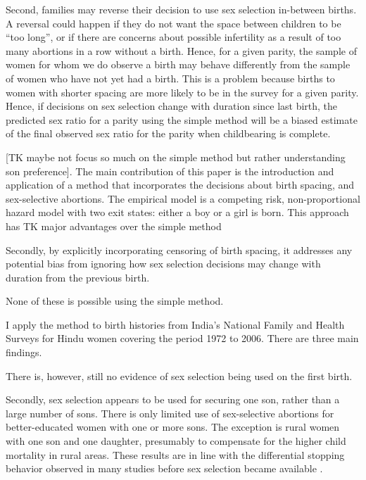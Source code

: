 \documentclass[12pt,letterpaper]{article}
\begin{document}
Second,
families may reverse their decision to use sex selection in-between births.
A reversal could happen if they do not want the space between children to be 
``too long'', or if there are concerns about possible infertility as a result of 
too many abortions in a row without a birth.
Hence, for a given parity, the sample of women for whom we do observe a birth 
may behave differently from the sample of women who have not yet had a birth.
This is a problem because births to women with shorter spacing are more likely 
to be in the survey for a given parity.
Hence, if decisions on sex selection change with duration since last birth,
the predicted sex ratio for a parity using the simple method will be a 
biased estimate of the final observed sex ratio for the parity when 
childbearing is complete.



[TK maybe not focus so much on the simple method but rather understanding son preference].
The main contribution of this paper is the introduction and application of a method that 
incorporates the decisions about birth spacing, and sex-selective abortions.
The empirical model is a competing risk, non-proportional hazard model with two exit 
states: either a boy or a girl is born.
This approach has TK major advantages over the simple method 

Secondly, by explicitly incorporating censoring of birth spacing, it addresses any 
potential bias from ignoring how sex selection decisions may change with duration from 
the previous birth.

None of these is possible using the simple method.

I apply the method to birth histories from India's National Family and Health Surveys 
for Hindu women covering the period 1972 to 2006. 
There are three main findings.

There is, however, still no evidence of sex selection being used on the first birth.

Secondly, sex selection appears to be used for securing one son, rather than a large 
number of sons.
There is only limited use of sex-selective abortions for better-educated
women with one or more sons.
The exception is rural women with one son and one daughter, presumably to compensate for 
the higher child mortality in rural areas.
These results are in line with the differential stopping behavior observed in many studies
before sex selection became available \citep{repetto72,arnold98,dreze01}.
\end{document}
